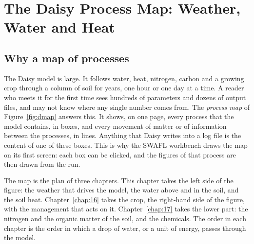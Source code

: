 \chapter{The Daisy Process Map: Weather, Water and Heat}\label{chap:15}
\label{ch:map1}
\section{Why a map of processes}
The Daisy model is large. It follows water, heat, nitrogen, carbon and a growing crop through a column of soil for years, one hour or one day at a time. A reader who meets it for the first time sees hundreds of parameters and dozens of output files, and may not know where any single number comes from. The \emph{process map} of Figure~\ref{fig:dmap} answers this. It shows, on one page, every process that the model contains, in boxes, and every movement of matter or of information between the processes, in lines. Anything that Daisy writes into a log file is the content of one of these boxes. This is why the SWAFL workbench draws the map on its first screen: each box can be clicked, and the figures of that process are then drawn from the run.

\par\noindent The map is the plan of three chapters. This chapter takes the left side of the figure: the weather that drives the model, the water above and in the soil, and the soil heat. Chapter~\ref{chap:16} takes the crop, the right-hand side of the figure, with the management that acts on it. Chapter~\ref{chap:17} takes the lower part: the nitrogen and the organic matter of the soil, and the chemicals. The order in each chapter is the order in which a drop of water, or a unit of energy, passes through the model.

\label{fig:dmap}

